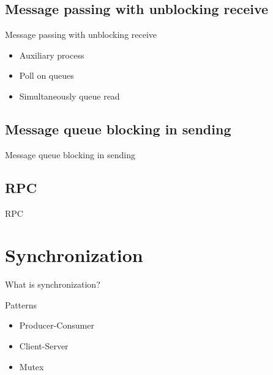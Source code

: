 \documentclass[10pt, compress, aspectratio=169]{beamer}
\begin{document}
\subsection{Message passing with unblocking receive}
\begin{frame}{Message passing with unblocking receive}
  \begin{itemize}
    \item Auxiliary process
    \item Poll on queues
    \item Simultaneously queue read
  \end{itemize}
\end{frame}

\subsection{Message queue blocking in sending}
\begin{frame}{Message queue blocking in sending}
\end{frame}

\subsection{RPC}
\begin{frame}{RPC}
\end{frame}

\section{Synchronization}
\begin{frame}{What is synchronization?}
\end{frame}

\begin{frame}{Patterns}
  \begin{itemize}
    \item Producer-Consumer
    \item Client-Server
    \item Mutex
  \end{itemize}
\end{frame}

\end{document}
